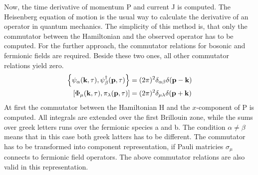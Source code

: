 Now, the time derivative of momentum P and current J is computed.
The Heisenberg equation of motion is the usual way to calculate the derivative of an operator in quantum mechanics.
The simplicity of this method is, that only the commutator between the Hamiltonian and the observed operator has to be computed.
For the further approach, the commutator relations for bosonic and fermionic fields are required.
Beside these two ones, all other commutator relations yield zero.
%
\begin{align}
	\acomm{\psi_{\mt{\alpha}}(\vb{k},\tau)}{\psi_{\mt{\beta}}^{\dag}(\vb{p},\tau)} &= (2\pi)^{2} \delta_{\mt{\alpha}\mt{\beta}} \delta(\vb{p}-\vb{k})
	\\
	\comm{\Phi_{\mu}(\vb{k},\tau)}{\pi_{\lambda}(\vb{p},\tau)} &= (2\pi)^{2} \delta_{\mu\lambda} \delta(\vb{p}+\vb{k})
\end{align}
%
At first the commutator between the Hamiltonian H and the $x$-component of P is computed.
All integrals are extended over the first Brillouin zone, while the sums over greek letters runs over the fermionic species a and b.
The condition $\alpha \neq \beta$ means that in this case both greek latters has to be different.
The commutator has to be transformed into component representation, if Pauli matricies $\sigma_{\mu}$ connects to fermionic field operators.
The above commutator relations are also valid in this representation.
%
